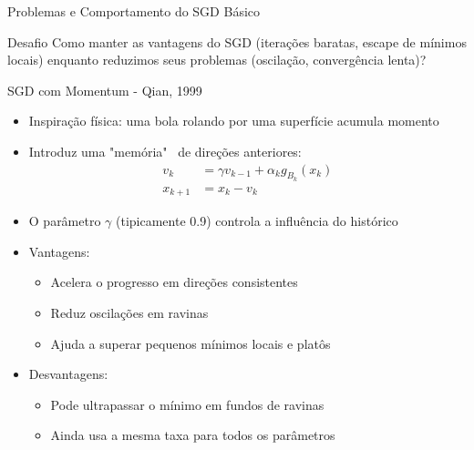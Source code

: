 \documentclass[aspectratio=1610]{beamer}
\begin{document}
\begin{frame}{Problemas e Comportamento do SGD Básico}
\vspace{0.3cm}
\begin{alertblock}{Desafio}
Como manter as vantagens do SGD (iterações baratas, escape de mínimos locais) enquanto reduzimos seus problemas (oscilação, convergência lenta)?
\end{alertblock}
\end{frame}

\begin{frame}{SGD com Momentum - Qian, 1999}
\begin{itemize}
    \item Inspiração física: uma bola rolando por uma superfície acumula momento \pause
    \item Introduz uma "memória"~ de direções anteriores: \pause
    \begin{align*}
        v_k &= \gamma v_{k-1} + \alpha_k g_{B_k}(x_k) \\
        x_{k+1} &= x_k - v_k
    \end{align*} \pause
    \item O parâmetro $\gamma$ (tipicamente 0.9) controla a influência do histórico \pause
    \item Vantagens: \pause
    \begin{itemize}
        \item Acelera o progresso em direções consistentes \pause
        \item Reduz oscilações em ravinas \pause
        \item Ajuda a superar pequenos mínimos locais e platôs
    \end{itemize} \pause
    \item Desvantagens: \pause
    \begin{itemize}
        \item Pode ultrapassar o mínimo em fundos de ravinas \pause
        \item Ainda usa a mesma taxa para todos os parâmetros
    \end{itemize}
\end{itemize}
\end{frame}
\end{document}
